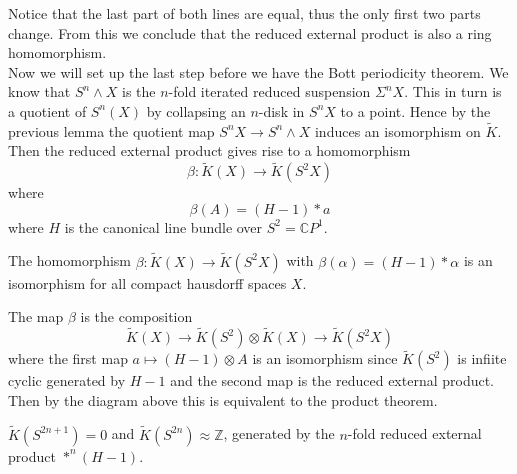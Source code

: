 \documentclass[../Thesis.tex]{subfiles}
\begin{document}
\begin{center}
\end{center}
Notice that the last part of both lines are equal, thus the only first two parts change. From this we conclude that the reduced external product is also a ring homomorphism.
\\Now we will set up the last step before we have the Bott periodicity theorem. We know that $S^n \wedge X$ is the $n$-fold iterated reduced suspension $\Sigma^n X$. This in turn is a quotient of $S^n(X)$ by collapsing an $n$-disk in $S^nX$ to a point. Hence by the previous lemma the quotient map $S^nX \rightarrow S^n \wedge X$ induces an isomorphism on $\tilde{K}$.
\\Then the reduced external product gives rise to a homomorphism 
\begin{equation}
\beta: \tilde{K}(X) \rightarrow \tilde{K}(S^2 X)
\end{equation} where 
\begin{equation}
\beta(A) = (H - 1) * a
\end{equation}
where $H$ is the canonical line bundle over $S^2 = \mathbb{C}P^1$. 
\begin{theorem}
The homomorphism $\beta : \tilde{K}(X) \rightarrow \tilde{K}(S^2X)$ with $\beta(\alpha) = (H-1) * \alpha$ is an isomorphism for all compact hausdorff spaces $X$.
\end{theorem}
\begin{myproof}
The map $\beta$ is the composition 
\begin{equation}\tilde{K}(X) \rightarrow \tilde{K}(S^2)\otimes \tilde{K}(X) \rightarrow \tilde{K}(S^2X)
\end{equation}
where the first map $a \mapsto (H-1) \otimes A$ is an isomorphism since $\tilde{K}(S^2)$ is infiite cyclic generated by $H-1$ and the second map is the reduced external product. Then by the diagram above this is equivalent to the product theorem.
\end{myproof}
\begin{Cor}
$\tilde{K}(S^{2n+1}) = 0$ and $\tilde{K}(S^{2n}) \approx \mathbb{Z}$, generated by the $n$-fold reduced external product $*^n(H-1)$.
\end{Cor}
\end{document}

